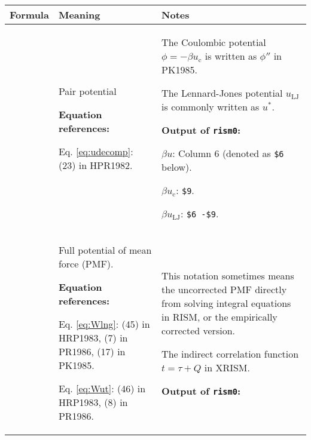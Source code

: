 \documentclass{article}
\begin{document}
\renewcommand{\theequation}{\Alph{equation}}

\newcommand{\refs}{\textbf{Equation references:}}

\newcommand{\rismprog}{\textbf{Output of \texttt{rism0}:}}


\begin{center}\footnotesize
\begin{tabular}{ >{\arraybackslash}m{2.3in}  >{\arraybackslash}m{2.2in}  >{\arraybackslash}m{2.2in} }

Formula
&
Meaning
&
Notes
\\
\hline

{
\begin{align}
  \beta u
&= \beta u_\mathrm{LJ} + \beta u_\mathrm{c}
\notag \\
&= -\phi^* - \phi.
\label{eq:udecomp}
\end{align}
}
&
Pair potential

\refs

Eq. \eqref{eq:udecomp}: (23) in HPR1982.
&
The Coulombic potential $\phi = -\beta u_\mathrm{c}$
is written as $\phi''$ in PK1985.

The Lennard-Jones potential $u_\mathrm{LJ}$
is commonly written as $u^*$.

\rismprog

$\beta u$: Column 6 (denoted as \texttt{\$6} below).

$\beta u_\mathrm{c}$: \texttt{\$9}.

$\beta u_\mathrm{LJ}$: \texttt{\$6 -\$9}.
\\



{
\begin{align}
\beta W
&= -\ln g
   \label{eq:Wlng} \\
&= \beta u - t. \; \mbox{(for HNC)}
   \label{eq:Wut}
\end{align}
}
&
Full potential of mean force (PMF).

\refs

Eq. \eqref{eq:Wlng}:
(45) in HRP1983,
(7) in PR1986,
(17) in PK1985.

Eq. \eqref{eq:Wut}:
(46) in HRP1983,
(8) in PR1986.
&
This notation sometimes means
the uncorrected PMF directly from
solving integral equations in RISM,
or the empirically corrected version.

The indirect correlation function $t = \tau + Q$
in XRISM.

\rismprog


\end{tabular}
\end{center}
\end{document}
